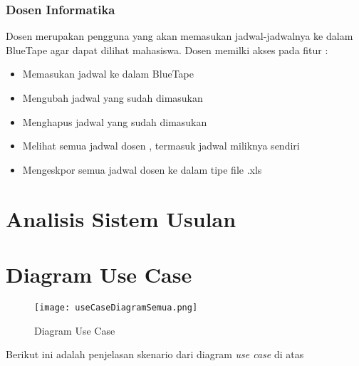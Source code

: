 \subsubsection{Dosen Informatika}
Dosen merupakan pengguna yang akan memasukan jadwal-jadwalnya ke dalam BlueTape agar dapat dilihat mahasiswa. Dosen memilki akses pada fitur :
\begin{itemize}
	\item Memasukan jadwal ke dalam BlueTape
	\item Mengubah jadwal yang sudah dimasukan  
	\item Menghapus jadwal yang sudah dimasukan
	\item Melihat semua jadwal dosen , termasuk jadwal miliknya sendiri
	\item Mengeskpor semua jadwal dosen ke dalam tipe file .xls
\end{itemize}

\section{Analisis Sistem Usulan}

\section{Diagram Use Case}
\begin{figure} [H]
	\centering  
	\texttt{[image: useCaseDiagramSemua.png]}
	\caption[Diagram Use Case]{Diagram Use Case} 
	\label{fig:flow-chart-CodeIgniter} 
\end{figure}
Berikut ini adalah penjelasan skenario dari diagram \textit{use case} di atas

